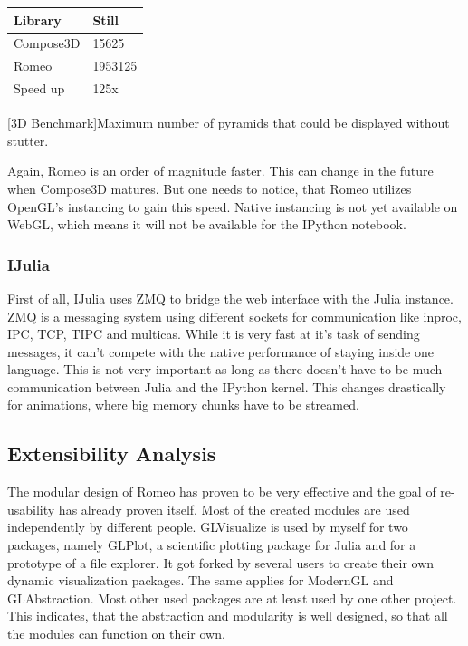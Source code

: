 \begin{table}[htbp]
    \centering
    \begin{tabular}{l|l}
        \hline
        \textbf{Library} & \textbf{Still}\\ 
        \hline
        Compose3D        & 15625         \\
        Romeo            & 1953125       \\
        \hline
        \hline
        Speed up         & 125x          \\
    \end{tabular}
    [3D Benchmark]{Maximum number of pyramids that could be displayed without stutter.}
    \label{table:relativespeedoglw}
\end{table}
Again, Romeo is an order of magnitude faster. This can change in the future when Compose3D matures.
But one needs to notice, that Romeo utilizes OpenGL's instancing to gain this speed. Native instancing is not yet available on WebGL, which means it will not be available for the IPython notebook.


\subsubsection{IJulia}
First of all, IJulia uses ZMQ to bridge the web interface with the Julia instance.
ZMQ is a messaging system using different sockets for communication like inproc, IPC, TCP, TIPC and multicas.
While it is very fast at it's task of sending messages, it can't compete with the native performance of staying inside one language.
This is not very important as long as there doesn't have to be much communication between Julia and the IPython kernel. This changes drastically for animations, where big memory chunks have to be streamed.


\subsection{Extensibility Analysis}

The modular design of Romeo has proven to be very effective and the goal of re-usability has already proven itself.
Most of the created modules are used independently by different people.
GLVisualize is used by myself for two packages, namely GLPlot, a scientific plotting package for Julia and for a prototype of a file explorer. 
It got forked by several users to create their own dynamic visualization packages.
The same applies for ModernGL and GLAbstraction. Most other used packages are at least used by one other project.
This indicates, that the abstraction and modularity is well designed, so that all the modules can function on their own.

